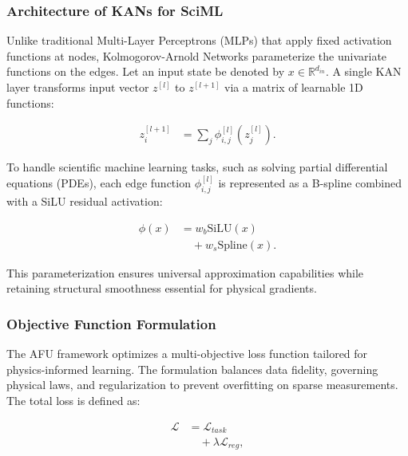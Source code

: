 \documentclass[10pt,twocolumn]{article}
\begin{document}
\subsubsection{Architecture of KANs for SciML}

Unlike traditional Multi-Layer Perceptrons (MLPs) that apply fixed activation functions at nodes, Kolmogorov-Arnold Networks parameterize the univariate functions on the edges. 
Let an input state be denoted by $x \in \mathbb{R}^{d_{in}}$. 
A single KAN layer transforms input vector $z^{[l]}$ to $z^{[l+1]}$ via a matrix of learnable 1D functions:

\begin{equation}
\begin{aligned}
z_i^{[l+1]} &= \sum_{j} \phi_{i,j}^{[l]} \left( z_j^{[l]} \right).
\end{aligned}
\end{equation}

To handle scientific machine learning tasks, such as solving partial differential equations (PDEs), each edge function $\phi_{i,j}^{[l]}$ is represented as a B-spline combined with a SiLU residual activation:

\begin{equation}
\begin{aligned}
\phi(x) &= w_b \text{SiLU}(x) \\
&\quad + w_s \text{Spline}(x).
\end{aligned}
\end{equation}

This parameterization ensures universal approximation capabilities while retaining structural smoothness essential for physical gradients.

\subsubsection{Objective Function Formulation}

The AFU framework optimizes a multi-objective loss function tailored for physics-informed learning. 
The formulation balances data fidelity, governing physical laws, and regularization to prevent overfitting on sparse measurements. 
The total loss is defined as:

\begin{equation}
\begin{aligned}
\mathcal{L} &= \mathcal{L}_{task} \\
&\quad + \lambda \mathcal{L}_{reg},
\end{aligned}
\end{equation}
\end{document}
